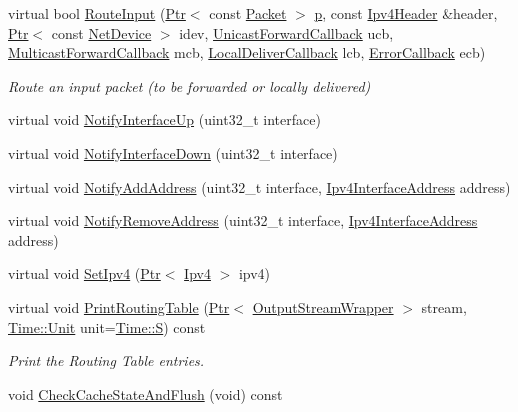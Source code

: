 \begin{DoxyCompactItemize}
virtual bool \hyperlink{classns3_1_1Ipv4NixVectorRouting_a35d3d496fc0f96e1fd0106b353404c0c}{Route\+Input} (\hyperlink{classns3_1_1Ptr}{Ptr}$<$ const \hyperlink{classns3_1_1Packet}{Packet} $>$ \hyperlink{lte__link__budget__x2__handover__measures_8m_ac9de518908a968428863f829398a4e62}{p}, const \hyperlink{classns3_1_1Ipv4Header}{Ipv4\+Header} \&header, \hyperlink{classns3_1_1Ptr}{Ptr}$<$ const \hyperlink{classns3_1_1NetDevice}{Net\+Device} $>$ idev, \hyperlink{classns3_1_1Ipv4RoutingProtocol_a3453a85764cbbb1e704da7e919aa5d19}{Unicast\+Forward\+Callback} ucb, \hyperlink{classns3_1_1Ipv4RoutingProtocol_a26e76f7a555462e6c08fceda64a99d58}{Multicast\+Forward\+Callback} mcb, \hyperlink{classns3_1_1Ipv4RoutingProtocol_aa6ffa0159cb143daa3c46d2ba69bb1b9}{Local\+Deliver\+Callback} lcb, \hyperlink{classns3_1_1Ipv4RoutingProtocol_a0348285418c30d5021b08f7a68af21ea}{Error\+Callback} ecb)
\begin{DoxyCompactList}\small\item\em Route an input packet (to be forwarded or locally delivered) \end{DoxyCompactList}\item 
virtual void \hyperlink{classns3_1_1Ipv4NixVectorRouting_a61f49f7c0ef8115c3d616d99f97052dc}{Notify\+Interface\+Up} (uint32\+\_\+t interface)
\item 
virtual void \hyperlink{classns3_1_1Ipv4NixVectorRouting_a4b9bfdc6d15165db72aa091f11fa899e}{Notify\+Interface\+Down} (uint32\+\_\+t interface)
\item 
virtual void \hyperlink{classns3_1_1Ipv4NixVectorRouting_a045c6307b4b2c6956471073066a48b16}{Notify\+Add\+Address} (uint32\+\_\+t interface, \hyperlink{classns3_1_1Ipv4InterfaceAddress}{Ipv4\+Interface\+Address} address)
\item 
virtual void \hyperlink{classns3_1_1Ipv4NixVectorRouting_a2a58d2c4a51a82a74456c5205ff1204e}{Notify\+Remove\+Address} (uint32\+\_\+t interface, \hyperlink{classns3_1_1Ipv4InterfaceAddress}{Ipv4\+Interface\+Address} address)
\item 
virtual void \hyperlink{classns3_1_1Ipv4NixVectorRouting_aff290a5e6590fb40ef8de74abfeebc74}{Set\+Ipv4} (\hyperlink{classns3_1_1Ptr}{Ptr}$<$ \hyperlink{classns3_1_1Ipv4}{Ipv4} $>$ ipv4)
\item 
virtual void \hyperlink{classns3_1_1Ipv4NixVectorRouting_ad9c8c58d1641ddc1b3dc6245f4d30213}{Print\+Routing\+Table} (\hyperlink{classns3_1_1Ptr}{Ptr}$<$ \hyperlink{classns3_1_1OutputStreamWrapper}{Output\+Stream\+Wrapper} $>$ stream, \hyperlink{classns3_1_1Time_a87a7f4d29c68b047a72d291ad660295a}{Time\+::\+Unit} unit=\hyperlink{classns3_1_1Time_a87a7f4d29c68b047a72d291ad660295aade8622b06524a328cd3a59db6ccf76af}{Time\+::S}) const 
\begin{DoxyCompactList}\small\item\em Print the Routing Table entries. \end{DoxyCompactList}\item 
void \hyperlink{classns3_1_1Ipv4NixVectorRouting_aeeafd72dfb17da8349627232c9e9984f}{Check\+Cache\+State\+And\+Flush} (void) const 
\end{DoxyCompactItemize}
